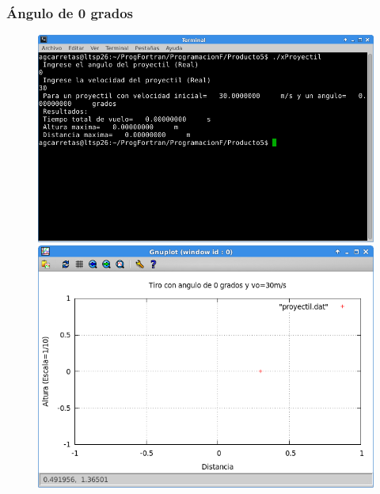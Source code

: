 \documentclass[a4paper]{article}
\begin{document}
\subsubsection{Ángulo de 0 grados}
\begin{figure}[H]
    \centering
    \includegraphics[width=12cm]{0} \\
    \includegraphics[width=12cm]{0plot}
  \end{figure} 
\end{document}
